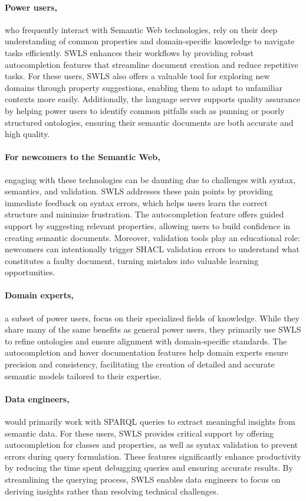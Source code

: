 \paragraph{Power users,} who frequently interact with Semantic Web technologies, rely on their deep understanding of common properties and domain-specific knowledge to navigate tasks efficiently.
SWLS enhances their workflows by providing robust autocompletion features that streamline document creation and reduce repetitive tasks.
For these users, SWLS also offers a valuable tool for exploring new domains through property suggestions, enabling them to adapt to unfamiliar contexts more easily. 
Additionally, the language server supports quality assurance by helping power users to identify common pitfalls such as punning or poorly structured ontologies, ensuring their semantic documents are both accurate and high quality.

\paragraph{For newcomers to the Semantic Web,} engaging with these technologies can be daunting due to challenges with syntax, semantics, and validation. 
SWLS addresses these pain points by providing immediate feedback on syntax errors, which helps users learn the correct structure and minimize frustration.
The autocompletion feature offers guided support by suggesting relevant properties, allowing users to build confidence in creating semantic documents.
Moreover, validation tools play an educational role: newcomers can intentionally trigger SHACL validation errors to understand what constitutes a faulty document,
turning mistakes into valuable learning opportunities.

\paragraph{Domain experts,} a subset of power users, focus on their specialized fields of knowledge. 
While they share many of the same benefits as general power users, they primarily use SWLS to refine ontologies and ensure alignment with domain-specific standards. 
The autocompletion and hover documentation features help domain experts ensure precision and consistency, facilitating the creation of detailed and accurate semantic models tailored to their expertise.

\paragraph{Data engineers,} would primarily work with SPARQL queries to extract meaningful insights from semantic data. 
For these users, SWLS provides critical support by offering autocompletion for classes and properties, as well as syntax validation to prevent errors during query formulation. 
These features significantly enhance productivity by reducing the time spent debugging queries and ensuring accurate results. 
By streamlining the querying process, SWLS enables data engineers to focus on deriving insights rather than resolving technical challenges.


